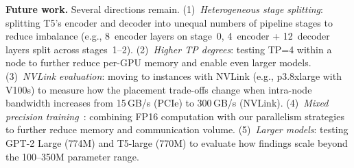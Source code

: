 \documentclass[conference]{IEEEtran}
\begin{document}
\textbf{Future work.} Several directions remain. (1)~\textit{Heterogeneous stage splitting}: splitting T5's encoder and decoder into unequal numbers of pipeline stages to reduce imbalance (e.g., 8~encoder layers on stage~0, 4~encoder + 12~decoder layers split across stages~1--2). (2)~\textit{Higher TP degrees}: testing TP=4 within a node to further reduce per-GPU memory and enable even larger models. (3)~\textit{NVLink evaluation}: moving to instances with NVLink (e.g., p3.8xlarge with V100s) to measure how the placement trade-offs change when intra-node bandwidth increases from 15\,GB/s (PCIe) to 300\,GB/s (NVLink). (4)~\textit{Mixed precision training}~\cite{micikevicius2018mixed}: combining FP16 computation with our parallelism strategies to further reduce memory and communication volume. (5)~\textit{Larger models}: testing GPT-2 Large (774M) and T5-large (770M) to evaluate how findings scale beyond the 100--350M parameter range.



\end{document}
